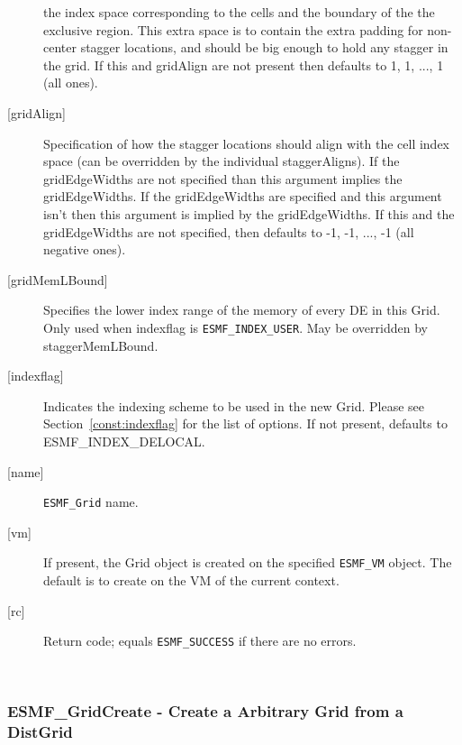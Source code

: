 \begin{description}
        the index space corresponding to the cells and the boundary of the
        the exclusive region. This extra space is to contain the extra
        padding for non-center stagger locations, and should be big enough
        to hold any stagger in the grid. If this and gridAlign are not present then
        defaults to 1, 1, ..., 1 (all ones).
   \item[{[gridAlign]}]
       Specification of how the stagger locations should align with the cell
       index space (can be overridden by the individual staggerAligns). If
       the gridEdgeWidths are not specified than this argument
       implies the gridEdgeWidths. If the gridEdgeWidths are specified and this argument isn't
       then this argument is implied by the gridEdgeWidths.
       If this and the gridEdgeWidths are not specified, then defaults to
      -1, -1, ..., -1 (all negative ones).
   \item[{[gridMemLBound]}]
        Specifies the lower index range of the memory of every DE in this Grid.
        Only used when indexflag is {\tt ESMF\_INDEX\_USER}. May be overridden
        by staggerMemLBound.
   \item[{[indexflag]}]
        Indicates the indexing scheme to be used in the new Grid. Please see
        Section~\ref{const:indexflag} for the list of options. If not present,
        defaults to ESMF\_INDEX\_DELOCAL.
   \item[{[name]}]
       {\tt ESMF\_Grid} name.
   \item[{[vm]}]
       If present, the Grid object is created on the specified
       {\tt ESMF\_VM} object. The default is to create on the VM of the
       current context.
   \item[{[rc]}]
        Return code; equals {\tt ESMF\_SUCCESS} if there are no errors.
   \end{description}
   
 
\mbox{}\hrulefill\ 
 
\subsubsection [ESMF\_GridCreate] {ESMF\_GridCreate - Create a Arbitrary Grid from a DistGrid}


